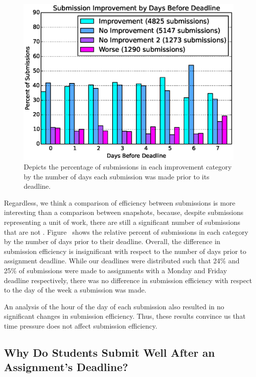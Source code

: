 \begin{figure}[!t]
\centering
\includegraphics[width=5.25in]{graphs/Submission_Improvement_by_Days_Before_Deadline.eps}
\caption{Depicts the percentage of submissions in each improvement category by
  the number of days each submission was made prior to its deadline.}
\end{figure}

Regardless, we think a comparison of efficiency between submissions is more
interesting than a comparison between snapshots, because, despite submissions
representing a unit of work, there are still a significant number of
submissions that are not \imp{}. Figure~ shows
the relative percent of submissions in each category by the number of days
prior to their deadline. Overall, the difference in submission efficiency is
insignificant with respect to the number of days prior to assignment
deadline. While our deadlines were distributed such that 24\% and 25\% of
submissions were made to assignments with a Monday and Friday deadline
respectively, there was no difference in submission efficiency with respect to
the day of the week a submission was made.

An analysis of the hour of the day of each submission also resulted in no
significant changes in submission efficiency. Thus, these results convince us
that time pressure does not affect submission efficiency.

\subsection{Why Do Students Submit Well After an Assignment's Deadline?}

